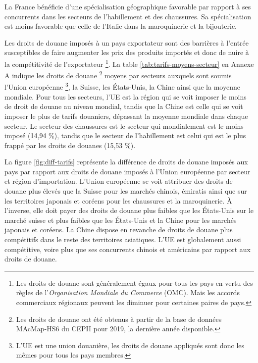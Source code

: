 \documentclass[french,10pt,a4paper]{article}
\begin{document}
\bigskip

La France bénéficie d'une spécialisation géographique favorable par rapport à ses concurrents dans les secteurs de l'habillement et des chaussures. Sa spécialisation est moins favorable que celle de l'Italie dans la maroquinerie et la bijouterie.

% 
\begin{tcolorbox}[title=Encadré 1 : Droits de douane]
  \small
  Les droits de douane imposés à un pays exportateur sont des barrières à l'entrée susceptibles de faire augmenter les prix des produits importés et donc de nuire à la compétitivité de l'exportateur \footnote{Les droits de douane sont généralement égaux pour tous les pays en vertu des règles de l'\textit{Organisation Mondiale du Commerce} (OMC). Mais les accords commerciaux régionaux peuvent les diminuer pour certaines paires de pays.}. La table \ref{tab:tarifs-moyens-secteur} en Annexe A indique les droits de douane \footnote{Les droits de douane ont été obtenus à partir de la base de données MAcMap-HS6 du CEPII \citep{Guimbard2012} pour 2019, la dernière année disponible.} moyens par secteurs auxquels sont soumis l'Union européenne \footnote{L'UE est une union douanière, les droits de douane appliqués sont donc les mêmes pour tous les pays membres.}, la Suisse, les États-Unis, la Chine ainsi que la moyenne mondiale. Pour tous les secteurs, l'UE est la région qui se voit imposer le moins de droit de douane au niveau mondial, tandis que la Chine est celle qui se voit imposer le plus de tarifs douaniers, dépassant la moyenne mondiale dans chaque secteur. Le secteur des chaussures est le secteur qui mondialement est le moins imposé (14,94 \%), tandis que le secteur de l'habillement est celui qui est le plus frappé par les droits de douanes (15,53 \%).

  \medskip
  
  La figure \ref{fig:diff-tarifs} représente la différence de droits de douane imposés aux pays par rapport aux droits de douane imposés à l'Union européenne par secteur et région d'importation. L'Union européenne se voit attribuer des droits de douane plus élevés que la Suisse pour les marchés chinois, émiratis ainsi que sur les territoires japonais et coréens pour les chaussures et la maroquinerie. À l'inverse, elle doit payer des droits de douane plus faibles que les États-Unis sur le marché suisse et plus faibles que les États-Unis et la Chine pour les marchés japonais et coréens. La Chine dispose en revanche de droits de douane plus compétitifs dans le reste des territoires asiatiques. L'UE est globalement aussi compétitive, voire plus que ses concurrents chinois et américains par rapport aux droits de douane.


\end{tcolorbox}
\end{document}
